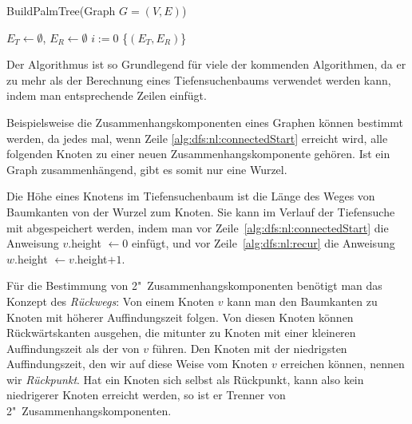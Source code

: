 \documentclass[a4paper]{scrreprt}
\theoremstyle{definition}
\begin{document}
\begin{algorithm}[ht]
  \caption{BuildPalmTree(Graph $G = (V,E)$)}
  \label{alg:dfs}
\BlankLine
  $E_T \leftarrow \emptyset$, $E_R \leftarrow \emptyset$ \;
  $i := 0$ \;
\BlankLine
\BlankLine
\BlankLine
    \Return\{$(E_T, E_R)$\}
\end{algorithm}

Der Algorithmus ist so Grundlegend für viele der kommenden Algorithmen, da er zu mehr als der Berechnung eines Tiefensuchenbaums verwendet werden kann, indem man entsprechende Zeilen einfügt. 

Beispielsweise die Zusammenhangskomponenten eines Graphen können bestimmt werden, da jedes mal, wenn Zeile \ref{alg:dfs:nl:connectedStart} erreicht wird, alle folgenden Knoten zu einer neuen Zusammenhangskomponente gehören. Ist ein Graph zusammenhängend, gibt es somit nur eine Wurzel.

Die Höhe eines Knotens im Tiefensuchenbaum ist die Länge des Weges von Baumkanten von der Wurzel zum Knoten. Sie kann im Verlauf der Tiefensuche mit abgespeichert werden, indem man vor Zeile~\ref{alg:dfs:nl:connectedStart} die Anweisung $v.$height $\leftarrow 0$ einfügt, und vor Zeile~\ref{alg:dfs:nl:recur} die Anweisung $w.$height $\leftarrow v.$height$ + 1$.


Für die Bestimmung von 2"~Zusammenhangskomponenten benötigt man das Konzept des \emph{Rückwegs}: Von einem Knoten $v$ kann man den Baumkanten zu Knoten mit höherer Auffindungszeit folgen. Von diesen Knoten können Rückwärtskanten ausgehen, die mitunter zu Knoten mit einer kleineren Auffindungszeit als der von $v$ führen. Den Knoten mit der niedrigsten Auffindungszeit, den wir auf diese Weise vom Knoten $v$ erreichen können, nennen wir \emph{Rückpunkt}. Hat ein Knoten sich selbst als Rückpunkt, kann also kein niedrigerer Knoten erreicht werden, so ist er Trenner von 2"~Zusammenhangskomponenten.
\end{document}
